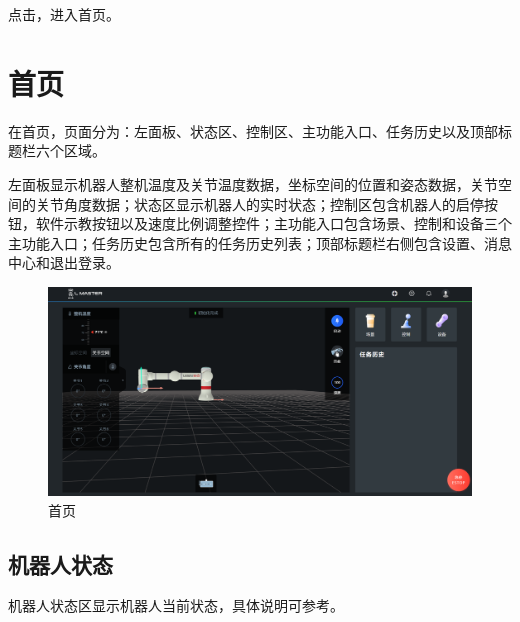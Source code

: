 点击，进入\LM 首页。

\clearpage

\section{首页}

在\LM 首页，页面分为：左面板、状态区、控制区、主功能入口、任务历史以及顶部标题栏六个区域。

左面板显示机器人整机温度及关节温度数据，坐标空间的位置和姿态数据，关节空间的关节角度数据；状态区显示机器人的实时状态；控制区包含机器人的启停按钮，软件示教按钮以及速度比例调整控件；主功能入口包含场景、控制和设备三个主功能入口；任务历史包含所有的任务历史列表；顶部标题栏右侧包含设置、消息中心和退出登录。

\begin{figure}[ht]
	\centering
	\includegraphics[width=\textwidth]{screen/2-10.png}
	\caption{\LM 首页}
	\label{fig:LM首页}
\end{figure}

\clearpage

\subsection{机器人状态}

机器人状态区显示机器人当前状态，具体说明可参考。

